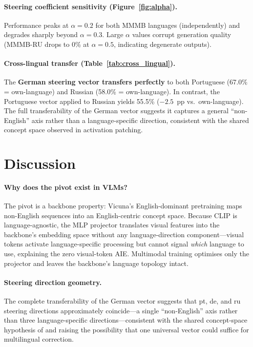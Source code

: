 \documentclass[11pt]{article}
\begin{document}
\paragraph{Steering coefficient sensitivity (Figure~\ref{fig:alpha}).}
Performance peaks at $\alpha{=}0.2$ for both MMMB languages (independently)
and degrades sharply beyond $\alpha{=}0.3$.
Large $\alpha$ values corrupt generation quality (MMMB-RU drops to 0\% at
$\alpha{=}0.5$, indicating degenerate outputs).

\paragraph{Cross-lingual transfer (Table~\ref{tab:cross_lingual}).}
The \textbf{German steering vector transfers perfectly} to both Portuguese
(67.0\% = own-language) and Russian (58.0\% = own-language).
In contrast, the Portuguese vector applied to Russian yields 55.5\%
($-2.5$~pp vs.\ own-language).
The full transferability of the German vector suggests it captures a general
``non-English'' axis rather than a language-specific direction, consistent
with the shared concept space observed in activation patching.

\section{Discussion}

\paragraph{Why does the pivot exist in VLMs?}
The pivot is a backbone property: Vicuna's English-dominant pretraining maps
non-English sequences into an English-centric concept space.
Because CLIP is language-agnostic, the MLP projector translates visual features
into the backbone's embedding space without any language-direction component---visual
tokens activate language-specific processing but cannot signal \emph{which}
language to use, explaining the zero visual-token AIE.
Multimodal training optimises only the projector and leaves the backbone's
language topology intact.

\paragraph{Steering direction geometry.}
The complete transferability of the German vector suggests that pt, de, and ru
steering directions approximately coincide---a single ``non-English'' axis
rather than three language-specific directions---consistent with the shared
concept-space hypothesis of \citet{wendler-etal-2024-llamas} and raising the
possibility that one universal vector could suffice for multilingual correction.
\end{document}
